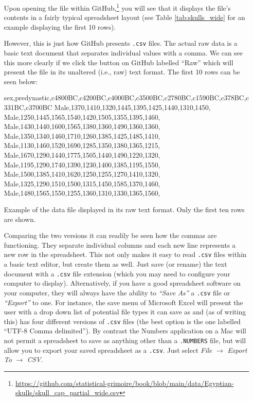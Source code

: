 Upon opening the file within GitHub,\footnote{\url{https://github.com/statistical-grimoire/book/blob/main/data/Egyptian-skulls/skull_cap_partial_wide.csv}} you will see that it displays the file's contents in a fairly typical spreadsheet layout (see Table \ref{tab:skulls_wide} for an example displaying the first 10 rows).

\vspace{1em}



\vspace{1em}

\noindent
However, this is just how GitHub presents \texttt{.csv} files. The actual raw data is a basic text document that separates individual values with a comma. We can see this more clearly if we click the button on GitHub labelled ``Raw'' which will present the file in its unaltered (i.e., raw) text format. The first 10 rows can be seen below:

\vspace{1em}
\begin{listing}[H]
\begin{raw}
sex,predynastic,c4800BC,c4200BC,c4000BC,c3500BC,c2780BC,c1590BC,c378BC,c331BC,c3700BC
Male,1370,1410,1320,1445,1395,1425,1440,1310,1450,
Male,1250,1445,1565,1540,1420,1505,1355,1395,1460,
Male,1430,1440,1600,1565,1380,1360,1490,1360,1360,
Male,1350,1340,1460,1710,1260,1385,1425,1485,1410,
Male,1130,1460,1520,1690,1285,1350,1380,1365,1215,
Male,1670,1290,1440,1775,1505,1440,1490,1220,1320,
Male,1195,1290,1740,1390,1230,1400,1385,1195,1550,
Male,1500,1385,1410,1620,1250,1255,1270,1410,1320,
Male,1325,1290,1510,1500,1315,1450,1585,1370,1460,
Male,1480,1565,1550,1255,1360,1310,1330,1365,1560,
\end{raw}
\caption*{Example of the  data file displayed in its raw text format. Only the first ten rows are shown.}
\end{listing}

\vspace{1em}

Comparing the two versions it can readily be seen how the commas are functioning. They separate individual columns and each new line represents a new row in the spreadsheet. This not only makes it easy to read \texttt{.csv} files within a basic text editor, but create them as well. Just save (or rename) the text document with a \texttt{.csv} file extension (which you may need to configure your computer to display). Alternatively, if you have a good spreadsheet software on your computer, they will always have the ability to \textit{``Save As''} a \texttt{.csv} file or \textit{``Export''} to one. For instance, the save menu of Microsoft Excel will present the user with a drop down list of potential file types it can save as and (as of writing this) has four different versions of \texttt{.csv} files (the best option is the one labelled ``UTF-8 Comma delimited''). By contrast the Numbers application on a Mac will not permit a spreadsheet to save as anything other than a \texttt{.NUMBERS} file, but will allow you to export your saved spreadsheet as a \texttt{.csv}. Just select \textit{File $\rightarrow$ Export To $\rightarrow$ CSV.}

